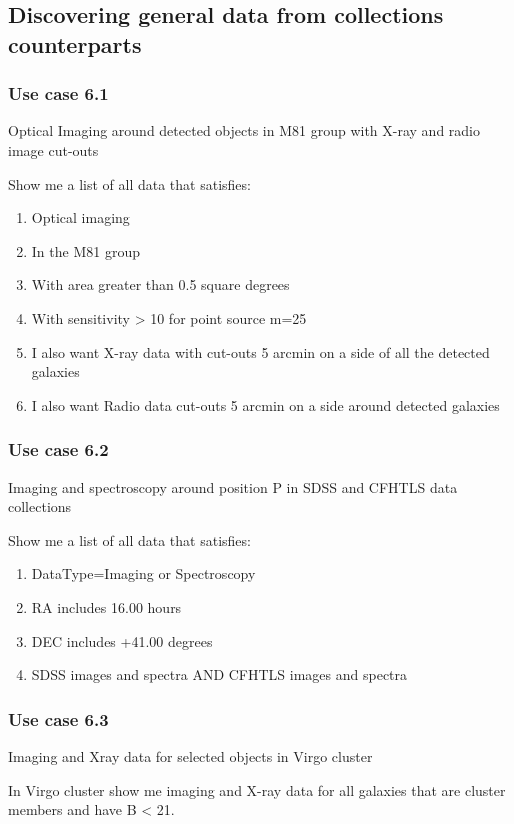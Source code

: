 \documentclass[11pt,a4paper]{ivoa}
\begin{document}
\subsection[Discovering general data from collections counterparts]{Discovering general data from collections
counterparts}
\subsubsection{Use case 6.1}
Optical Imaging around detected objects in M81 group with X-ray and radio image cut-outs 

Show me a list of all data that satisfies:

\begin{enumerate}
\item Optical imaging
\item In the M81 group
\item With area greater than 0.5 square degrees
\item With sensitivity {\textgreater} 10 for point source m=25
\item I also want X-ray data with cut-outs 5 arcmin on a side of all the detected galaxies
\item I also want Radio data cut-outs 5 arcmin on a side around detected galaxies
\end{enumerate}
\subsubsection{Use case 6.2}
Imaging and spectroscopy around position P in SDSS and CFHTLS data collections 

 Show me a list of all data that satisfies:

\begin{enumerate}
\item DataType=Imaging or Spectroscopy
\item RA includes 16.00 hours
\item DEC includes +41.00 degrees
\item SDSS images and spectra AND CFHTLS images and spectra
\end{enumerate}
\subsubsection{Use case 6.3}
Imaging and Xray data for selected objects in Virgo cluster 

In Virgo cluster show me imaging and X-ray data for all galaxies that are cluster members and have B {\textless} 21.
\end{document}
